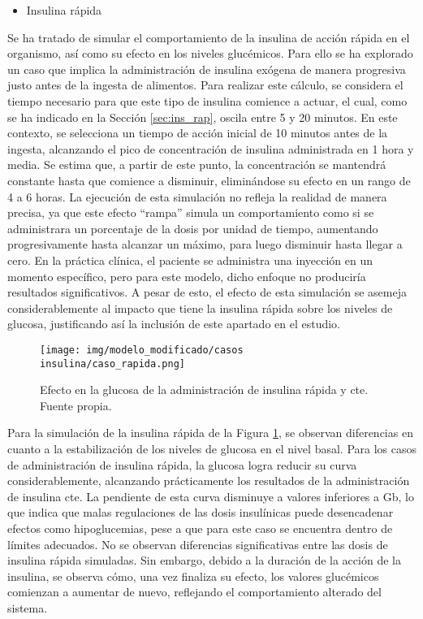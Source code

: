 \begin{itemize}
    \item Insulina rápida
\end{itemize}
Se ha tratado de simular el comportamiento de la insulina de acción rápida en el organismo, así como su efecto en los niveles glucémicos. Para ello se ha explorado un caso que implica la administración de insulina exógena de manera progresiva justo antes de la ingesta de alimentos. Para realizar este cálculo, se considera el tiempo necesario para que este tipo de insulina comience a actuar, el cual, como se ha indicado en la Sección \ref{sec:ins_rap}, oscila entre 5 y 20 minutos. En este contexto, se selecciona un tiempo de acción inicial de 10 minutos antes de la ingesta, alcanzando el pico de concentración de insulina administrada en 1 hora y media. Se estima que, a partir de este punto, la concentración se mantendrá constante hasta que comience a disminuir, eliminándose su efecto en un rango de 4 a 6 horas.
La ejecución de esta simulación no refleja la realidad de manera precisa, ya que este efecto “rampa” simula un comportamiento como si se administrara un porcentaje de la dosis por unidad de tiempo, aumentando progresivamente hasta alcanzar un máximo, para luego disminuir hasta llegar a cero. En la práctica clínica, el paciente se administra una inyección en un momento específico, pero para este modelo, dicho enfoque no produciría resultados significativos. A pesar de esto, el efecto de esta simulación se asemeja considerablemente al impacto que tiene la insulina rápida sobre los niveles de glucosa, justificando así la inclusión de este apartado en el estudio.
\clearpage
\begin{figure}[htbp]
    \centering
    \texttt{[image: img/modelo\_modificado/casos insulina/caso\_rapida.png]}
    \caption{Efecto en la glucosa de la administración de insulina rápida y cte. Fuente propia.}
    \label{fig:ins_rap_const}
\end{figure}

Para la simulación de la insulina rápida de la Figura \ref{fig:ins_rap_const}, se observan diferencias en cuanto a la estabilización de los niveles de glucosa en el nivel basal. Para los casos de administración de insulina rápida, la glucosa logra reducir su curva considerablemente, alcanzando prácticamente los resultados de la administración de insulina cte. La pendiente de esta curva disminuye a valores inferiores a Gb, lo que indica que malas regulaciones de las dosis insulínicas puede desencadenar efectos como hipoglucemias, pese a que para este caso se encuentra dentro de límites adecuados. No se observan diferencias significativas entre las dosis de insulina rápida simuladas. Sin embargo, debido a la duración de la acción de la insulina, se observa cómo, una vez finaliza su efecto, los valores glucémicos comienzan a aumentar de nuevo, reflejando el comportamiento alterado del sistema. 

